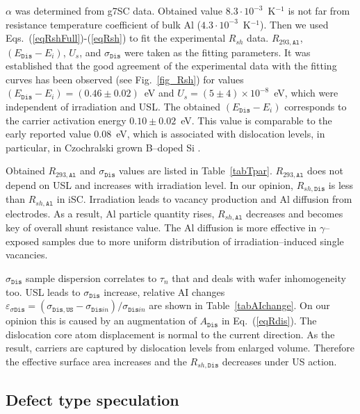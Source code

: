 \documentclass[aip,jap, amsmath,amssymb,reprint]{revtex4-1}
\begin{document}
$\alpha$ was determined from g7SC data.
Obtained value $8.3\cdot10^{-3}$~K$^{-1}$ is not far from resistance temperature coefficient of bulk Al ($4.3\cdot10^{-3}$~K$^{-1}$).
Then we used Eqs.~(\ref{eqRshFull})-(\ref{eqRsh}) to fit the experimental $R_{sh}$ data.
$R_{293,\mathtt{Al}}$, $(E_{\mathtt{Dis}}-E_i)$, $U_s$, and $\sigma_{\mathtt{Dis}}$ were taken as the fitting parameters.
It was established that the good agreement of the experimental data with the fitting curves has been observed (see Fig.~\ref{fig_Rsh}) for values $(E_{\mathtt{Dis}}-E_i)=(0.46\pm0.02)$~eV and $U_s=(5\pm4)\times10^{-8}$~eV, which were independent of irradiation and USL.
The obtained $(E_{\mathtt{Dis}}-E_i)$ corresponds to the carrier activation energy $0.10\pm0.02$~eV.
This value is comparable to the early reported \cite{disl10:Castaldini,disl10:Isakova,disl10:Yu,disl10:Kveder,disl10:Trushin}
value $0.08$~eV, which is associated with dislocation levels, in particular, in Czochralski grown B--doped Si \cite{disl10:Castaldini,disl10:Isakova,disl10:Yu}.

Obtained $R_{293,\mathtt{Al}}$ and $\sigma_{\mathtt{Dis}}$ values are listed in Table~\ref{tabTpar}.
$R_{293,\mathtt{Al}}$ does not depend on USL and increases with irradiation level.
In our opinion, $R_{sh,\mathtt{Dis}}$ is less than $R_{sh,\mathtt{Al}}$ in iSC.
Irradiation leads to vacancy production and Al diffusion from electrodes.
As a result, Al particle quantity rises, $R_{sh,\mathtt{Al}}$ decreases and becomes key of overall shunt resistance value.
The Al diffusion is more effective in $\gamma$--exposed samples due to more uniform distribution of irradiation--induced single vacancies.

$\sigma_{\mathtt{Dis}}$ sample dispersion correlates to $\tau_n$ that and deals with wafer inhomogeneity too.
USL leads to $\sigma_{\mathtt{Dis}}$ increase, relative AI changes
$\varepsilon_{\sigma\mathtt{Dis}}=(\sigma_{\mathtt{Dis,US}}-\sigma_{\mathtt{Dis}in})/\sigma_{\mathtt{Dis}in}$
are shown in Table~\ref{tabAIchange}.
On our opinion this is caused by an augmentation of  $A_\mathtt{Dis}$ in Eq.~(\ref{eqRdis}).
The dislocation core atom displacement  is  normal to the  current direction.
As the result, carriers are captured by dislocation levels from enlarged volume.
Therefore the effective surface area increases and the $R_{sh,\mathtt{Dis}}$ decreases under US action.


\subsection{Defect type speculation\label{DefectType}}
\end{document}
